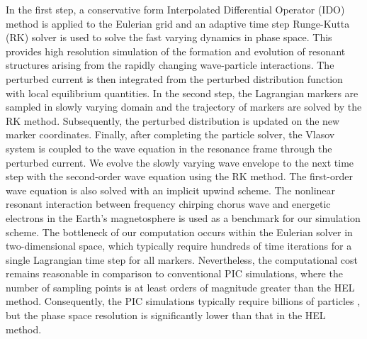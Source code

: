 \documentclass[times,12pt,3p,longtitle]{elsarticle}
\begin{document}
In the first step,  a conservative form Interpolated Differential Operator (IDO)  method is applied to the Eulerian grid 
and  an adaptive time step Runge-Kutta (RK)  solver is used to solve the  fast varying dynamics in  phase space. 
This provides high resolution simulation of 
the formation and evolution of resonant structures arising from the rapidly changing wave-particle interactions.
The perturbed current is then integrated from the perturbed distribution function with local equilibrium quantities.
In the second step, the  Lagrangian markers are sampled in slowly varying domain 
and 
the trajectory of markers
are solved by the RK method.
Subsequently,  the perturbed distribution is updated on the new marker coordinates. 
Finally, after completing the particle solver, 
the Vlasov system is coupled to the wave equation in the resonance frame through the perturbed current.
We evolve the  slowly varying wave envelope 
to the next time step
with the second-order  wave equation
using the RK method.
The first-order wave equation is also solved with 
 an implicit upwind scheme.
The nonlinear resonant interaction between frequency chirping  chorus wave and energetic electrons in the Earth's magnetosphere is used as a benchmark for our simulation scheme.
The bottleneck of our computation occurs within the Eulerian solver in two-dimensional space, which typically require hundreds of time iterations for a single Lagrangian time step for all markers. Nevertheless, the computational cost remains reasonable in comparison to conventional PIC simulations, where the number of sampling points is at least orders of magnitude greater than the HEL  method. Consequently, the PIC simulations typically require billions of particles \cite{nogi2022,katoh2016}, but the phase space resolution is significantly lower than 
that in the HEL method.
\end{document}
